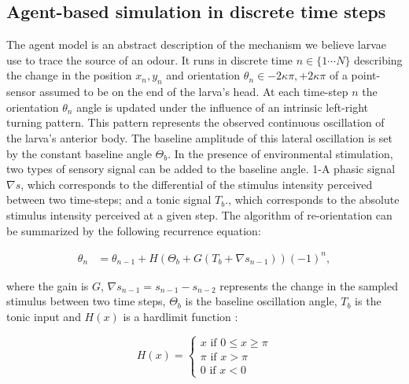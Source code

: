 \documentclass[11pt,a4paper]{article}
\begin{document}
\subsection{Agent-based simulation in discrete time steps}
\label{sec:methodsDiscreteAgent}
The agent model is an abstract description of the mechanism we believe larvae use to trace the source of an odour. It runs in discrete time $n \in \{1 \cdots N\}$ describing the change in the position $x_n,y_n$ and orientation $\theta_n \in {-2 \kappa \pi,+2 \kappa \pi}$ of a point-sensor assumed to be on the end of the larva's head. At each time-step $n$ the orientation $\theta_n$ angle is updated under the influence of an intrinsic left-right turning pattern. This pattern represents the observed continuous oscillation of the larva's anterior body. The baseline amplitude of this lateral oscillation is set by the constant baseline angle $\Theta_b$. In the presence of environmental stimulation, two types of sensory signal can be added to the baseline angle. 1-A phasic signal $\nabla s$, which corresponds to the differential of the stimulus intensity perceived between two time-steps; and a tonic signal $T_b$., which corresponds to the absolute stimulus intensity perceived at a given step. 
The algorithm of re-orientation can be summarized by the following recurrence equation:

\begin{align}
\theta_n &= \theta_{n-1} + H(\Theta_b + G (T_b + \nabla s_{n-1})){(-1)}^n,
\label{eqn:Discretemodel}
\end{align}

where the gain is $G$, $\nabla s_{n-1}  = s_{n-1} - s_{n-2}$ represents the change in the sampled stimulus between two time steps, $\Theta_b$ is the baseline oscillation angle, $T_b$ is the tonic input and $H(x)$ is a hardlimit function :

\begin{equation}
H(x) =
\begin{cases}
x \mbox{ if } 0 \leq x \geq \pi \\
\pi \mbox{ if } x > \pi  \\
0 \mbox{ if } x < 0 
\end{cases}
\end{equation}
\end{document}
